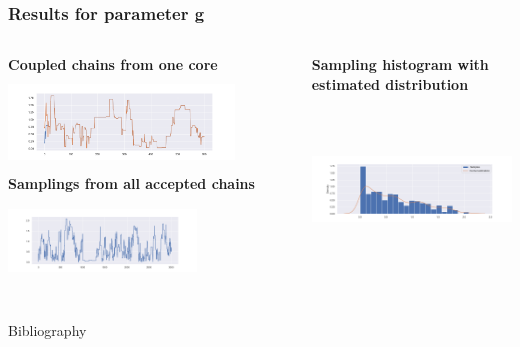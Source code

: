 \documentclass{beamer}
\begin{document}
\begin{frame}
	\frametitle{Results for parameter g}
	\begin{columns}
		\begin{column}{0.4\textwidth}
			{\scriptsize \textbf{Coupled chains from one core}}\\
			\includegraphics[width=6cm,height=2.5cm]{gk_all_pack/gk_all_chain_meeeting_3}
			\vspace{0.2cm}
			{\scriptsize \textbf{Samplings from all accepted chains}}\\
			\includegraphics[width=5cm,height=2.5cm]{gk_all_pack/gk_all_sampling_3}
		\end{column}
		\begin{column}{0.4\textwidth}
			{	\scriptsize \textbf{Sampling histogram with estimated distribution}}\\
			\includegraphics[width=6cm,height=5cm]{gk_all_pack/gk_all_histogram_kernel_3}
			
		\end{column}
	\end{columns}
\end{frame}
	\begin{frame}{Bibliography}
	\nocite{*}
	
	\tiny{  }
\end{frame}
\end{document}

